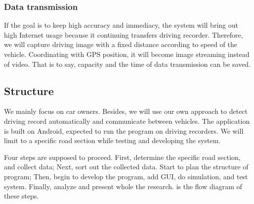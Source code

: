 \documentclass[preprint,12pt]{elsarticle}
\begin{document}
%
\subsubsection{Data transmission}
%

If the goal is to keep high accuracy and immediacy, the system will
bring out high Internet usage because it continuing transfers driving
recorder. Therefore, we will capture driving image with a fixed distance
according to speed of the vehicle. Coordinating with GPS position, it
will become image streaming instead of video. That is to say, capacity
and the time of data transmission can be saved.

%
\subsection{Structure}
%

We mainly focus on car owners. Besides, we will use our own approach to
detect driving record automatically and communicate between vehicles.
The application is built on Android, expected to run the program on
driving recorders. We will limit to a specific road section while
testing and developing the system.

Four steps are supposed to proceed. First, determine the specific road
section, and collect data; Next, sort out the collected data. Start
to plan the structure of program; Then, begin to develop the program,
add GUI, do simulation, and test system. Finally, analyze and present
whole the research.  is the flow diagram of these steps.
\end{document}
